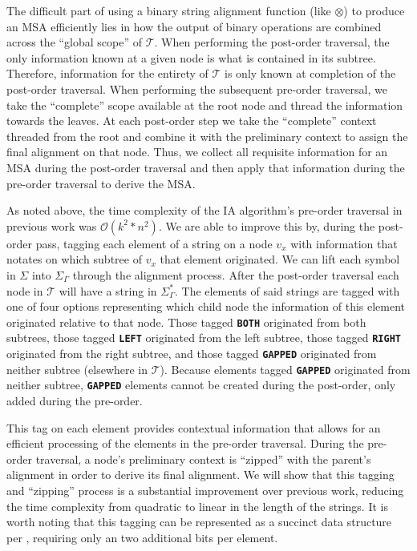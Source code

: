 \documentclass{bmcart}
\begin{document}
The difficult part of using a binary string alignment function (like $\otimes$) to produce an MSA efficiently lies in how the output of binary operations are combined across the ``global scope'' of $\mathcal{T}$.
When performing the post-order traversal, the only information known at a given node is what is contained in its subtree.
Therefore, information for the entirety of $\mathcal{T}$ is only known at completion of the post-order traversal.
When performing the subsequent pre-order traversal, we take the ``complete'' scope available at the root node and thread the information towards the leaves.
At each post-order step we take the ``complete'' context threaded from the root and combine it with the preliminary context to assign the final alignment on that node.
Thus, we collect all requisite information for an MSA during the post-order traversal and then apply that information during the pre-order traversal to derive the MSA.

As noted above, the time complexity of the IA algorithm's pre-order traversal in previous work was $\mathcal{O}(k^2 * n^2)$.
We are able to improve this by, during the post-order pass, tagging each element of a string on a node $v_x$ with information that notates on which subtree of $v_x$ that element originated.
We can lift each symbol in $\Sigma$ into $\Sigma_{\Gamma}$ through the alignment process.
After the post-order traversal each node in $\mathcal{T}$ will have a string in $\Sigma_{\Gamma}^{*}$.
The elements of said strings are tagged with one of four options representing which child node the information of this element originated relative to that node.
Those tagged \textbf{\texttt{BOTH}} originated from both subtrees, those tagged \textbf{\texttt{LEFT}} originated from the left subtree, those tagged \textbf{\texttt{RIGHT}} originated from the right subtree, and those tagged \textbf{\texttt{GAPPED}} originated from neither subtree (elsewhere in $\mathcal{T}$).
Because elements tagged \textbf{\texttt{GAPPED}} originated from neither subtree, \textbf{\texttt{GAPPED}} elements cannot be created during the post-order, only added during the pre-order.

This tag on each element provides contextual information that allows for an efficient processing of the elements in the pre-order traversal.
During the pre-order traversal, a node's preliminary context is ``zipped'' with the parent's alignment in order to derive its final alignment.
We will show that this tagging and ``zipping'' process is a substantial improvement over previous work, reducing the time complexity from quadratic to linear in the length of the strings.
It is worth noting that this tagging can be represented as a succinct data structure per \cite{Jacobson1988}, requiring only an two additional bits per element.
\end{document}
